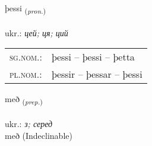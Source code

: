 \documentclass[frontgrid, backgrid]{flacards}\usepackage[]{graphicx}\usepackage[]{xcolor}
\begin{document}
\renewcommand{\flhead}{\vskip5pt \fboxsep=0pt {\small\bfseries\footnotesize Fornafn | займенник}}
\renewcommand{\fcfoot}{\vskip5pt \fboxsep=0pt \hspace{2pt}{\small\bfseries\footnotesize 1K}}

\renewcommand{\blhead}{\vskip5pt {\small\bfseries\footnotesize Fornafn | займенник }}
\renewcommand{\bcfoot}{\vskip5pt \hspace{2pt}{\small\bfseries\footnotesize 1K}}


{þessi \small{\textsubscript{(\textit{pron.})}} \\[1ex] %
\textphonetic{[θɛsɪ]} \\
ukr.: \emph{цей; ця; ций} \\  [2ex]
\renewcommand*{\arraystretch}{0.8}
\begin{tabular}{ll}
\textsc{sg.nom.}: & þessi  --  þessi -- þetta \\ 
\textsc{pl.nom.}: & þessir -- þessar -- þessi
\end{tabular}
}


\renewcommand{\flhead}{\vskip5pt \fboxsep=0pt {\small\bfseries\footnotesize Forsetning | прийменник}}
\renewcommand{\fcfoot}{\vskip5pt \fboxsep=0pt \hspace{2pt}{\small\bfseries\footnotesize 1K}}

\renewcommand{\blhead}{\vskip5pt {\small\bfseries\footnotesize Forsetning | прийменник }}
\renewcommand{\bcfoot}{\vskip5pt \hspace{2pt}{\small\bfseries\footnotesize 1K}}


{með \small{\textsubscript{(\textit{prep.})}} \\[1ex]
\textphonetic{[mɛːð]} \\
ukr.: \emph{з; серед} \\  [2ex]
með (Indeclinable)}


\renewcommand{\flhead}{\vskip5pt \fboxsep=0pt {\small\bfseries\footnotesize Forsetning | прийменник}}
\renewcommand{\fcfoot}{\vskip5pt \fboxsep=0pt \hspace{2pt}{\small\bfseries\footnotesize 1K}}
\end{document}

